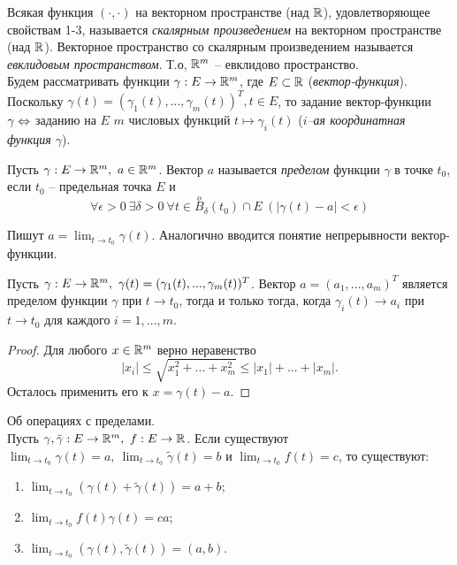 Всякая функция $(\cdot, \cdot)$ на векторном пространстве (над $\mathbb{R}$), удовлетворяющее свойствам 1-3, называется \textit{скалярным произведением} на векторном пространстве (над $\mathbb{R}$). Векторное пространство со скалярным произведением называется \textit{евклидовым пространством}. Т.о, $\mathbb{R}^{m}$ -- евклидово пространство.\\
Будем рассматривать функции $\gamma: E \to \mathbb{R}^{m}$, где $E \subset \mathbb{R}$ (\textit{вектор-функция}). Поскольку $\gamma(t) = (\gamma_{1}(t) , ... , \gamma_{m}(t))^{T}, t \in E$, то задание вектор-функции $\gamma \Leftrightarrow$ заданию на $E$ $m$ числовых функций $t \mapsto \gamma_{i}(t)$ (\textit{$i$--ая координатная функция $\gamma$}).

\begin{definition}
    Пусть $\gamma: E \to \mathbb{R}^{m}, \ a \in \mathbb{R}^{m}$. Вектор $a$ называется \textit{пределом} функции $\gamma$ в точке $t_{0}$, если $t_{0}$ -- предельная точка $E$ и 
    \[\forall \epsilon > 0 \ \exists \delta > 0 \ \forall t \in \overset{o}{B}_{\delta}(t_{0}) \cap E \ (|\gamma(t) - a| < \epsilon)\]
\end{definition}

Пишут $a = \lim_{t \to t_{0}} \gamma(t)$. Аналогично вводится понятие непрерывности вектор-функции.

\begin{theorem}
    Пусть $\gamma: E \to \mathbb{R}^{m}, \ \gamma(t) = (\gamma_{1}(t), ... , \gamma_{m}(t))^{T}$. Вектор $a = (a_{1}, ... , a_{m})^{T}$ является пределом функции $\gamma$ при $t \to t_{0}$, тогда и только тогда, когда $\gamma_{i}(t) \to a_{i}$ при $t \to t_{0}$ для каждого $i = 1, ... , m$.
\end{theorem}

\begin{proof}
    Для любого $x \in \mathbb{R}^{m}$ верно неравенство
    \[|x_{i}| \leq \sqrt{x_{1}^2 + ... + x_{m}^2} \leq |x_{1}| + ... + |x_{m}|.\]
    Осталось применить его к $x = \gamma(t) - a$.
\end{proof}

\begin{corollary}{Об операциях с пределами.}\\
    Пусть $\gamma, \tilde\gamma: E \to \mathbb{R}^m, \ f: E \to \mathbb{R}$. Если существуют $\lim_{t \to t_{0}}\gamma(t) = a, \ \lim_{t \to t_{0}}\tilde\gamma(t) = b$ и $\lim_{t \to t_{0}} f(t) = c$, то существуют:
    \begin{enumerate}
        \item $\lim_{t \to t_{0}}(\gamma(t) + \tilde\gamma(t)) = a + b$;
        \item $\lim_{t \to t_{0}} f(t)\gamma(t) = ca$;
        \item $\lim_{t \to t_{0}}(\gamma(t), \tilde\gamma(t)) = (a, b)$.
    \end{enumerate}
\end{corollary}


